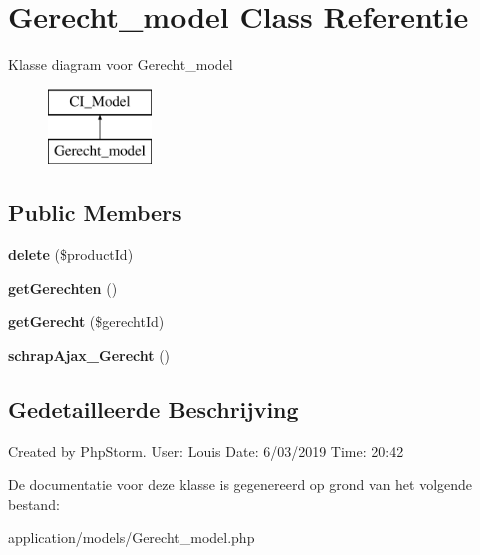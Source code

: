 \hypertarget{class_gerecht__model}{}\section{Gerecht\+\_\+model Class Referentie}
\label{class_gerecht__model}
Klasse diagram voor Gerecht\+\_\+model\begin{figure}[H]
\begin{center}
\leavevmode
\includegraphics[height=2.000000cm]{class_gerecht__model}
\end{center}
\end{figure}
\subsection*{Public Members}
\begin{DoxyCompactItemize}
\item 
\mbox{\label{class_gerecht__model_a16bdb278f98b81556f90a9b6f1e176f5}} 
{\bfseries delete} (\$product\+Id)
\item 
\mbox{\label{class_gerecht__model_a7edbda6e23ab2cbbbe578b74c69d450b}} 
{\bfseries get\+Gerechten} ()
\item 
\mbox{\label{class_gerecht__model_ae9b2588255ed09131eedef8f97855ff5}} 
{\bfseries get\+Gerecht} (\$gerecht\+Id)
\item 
\mbox{\label{class_gerecht__model_a59b1f2af6c0924da6d86ccb0d7333c43}} 
{\bfseries schrap\+Ajax\+\_\+\+Gerecht} ()
\end{DoxyCompactItemize}


\subsection{Gedetailleerde Beschrijving}
Created by Php\+Storm. User\+: Louis Date\+: 6/03/2019 Time\+: 20\+:42 

De documentatie voor deze klasse is gegenereerd op grond van het volgende bestand\+:\begin{DoxyCompactItemize}
\item 
application/models/Gerecht\+\_\+model.\+php\end{DoxyCompactItemize}
